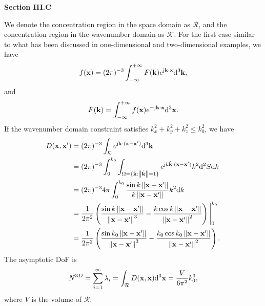 \documentclass[a4paper,12pt]{article}
\begin{document}
\begin{framed}
{\bf Section III.C}

\setcounter{equation}{27}

{\color{red} We denote the concentration region in the space domain as $\mathcal{R}$, and the concentration region in the wavenumber domain as $\mathcal{K}$.} For the first case similar to what has been discussed in one-dimensional and two-dimensional examples, we have 
\begin{equation}
	\begin{aligned}
		f({\bf x})=(2\pi)^{-3}\int_{-\infty}^{+\infty}F({\bf k})e^{{\rm j}{\bf k}\cdot {\bf x}}{\rm d}^3{\bf k},
	\end{aligned}
\end{equation}
and
\begin{equation}
	\begin{aligned}
		F({\bf k}) = \int_{-\infty}^{+\infty}f({\bf x})e^{-{\rm j}{\bf k}\cdot {\bf x}}{\rm d}^3{\bf x}.
	\end{aligned}
\end{equation}
If the wavenumber domain constraint satisfies $k_x^2+k_y^2+k_z^2 \leqslant k_0^2$, we have 
\begin{equation}
	\begin{aligned}
		D({\bf x},{\bf x}') &= (2\pi)^{-3}\int_{\mathcal{K}} e^{{\rm j}{\bf k}\cdot({\bf x}-{\bf x}')}{\rm d}^3{\bf k} \\&= (2\pi)^{-3} \int_{0}^{k_0} \int_{{\Omega}=\{\hat{\bf k}: \left\| \hat{\bf k} \right\|=1\}} e^{{\rm j}k\hat{\bf k}\cdot({\bf x}-{\bf x}')}k^2{\rm d}^2S{\rm d}k
		\\& = (2\pi)^{-3} 4\pi \int_0^{k_0} \frac{\sin k \left\| {\bf x}-{\bf x}' \right\|}{k \left\| {\bf x}-{\bf x}' \right\|}k^2 {\rm d}k
		\\& = \frac{1}{2\pi^2} \left( \frac{\sin k\left\| {\bf x}-{\bf x}' \right\|}{\left\| {\bf x}-{\bf x}' \right\|^3}-\frac{k\cos k\left\| {\bf x}-{\bf x}' \right\|}{\left\| {\bf x}-{\bf x}' \right\|^2} \right) \Bigg|_0^{k_0}
		\\& = \frac{1}{2\pi^2} \left( \frac{\sin k_0\left\| {\bf x}-{\bf x}' \right\|}{\left\| {\bf x}-{\bf x}' \right\|^3}-\frac{k_0\cos k_0\left\| {\bf x}-{\bf x}' \right\|}{\left\| {\bf x}-{\bf x}' \right\|^2} \right).
	\end{aligned}
	\label{equ_ball}
\end{equation}
The asymptotic DoF is 
\begin{equation}
	\begin{aligned}
		N^{3D} = \sum_{i=1}^\infty \lambda_i = \int_{\mathcal{R}}D({\bf x},{\bf x}){\rm d}^3{\bf x} = \frac{V}{6\pi^2}k_0^3,
	\end{aligned}
\end{equation}
{\color{red} where $V$ is the volume of $\mathcal{R}$.}


\end{framed}
\end{document}
